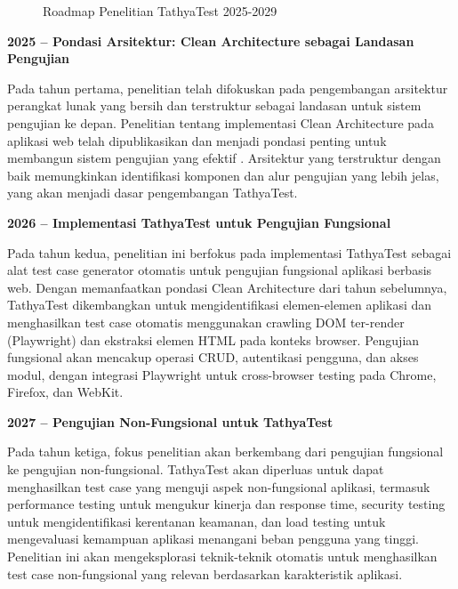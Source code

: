 \begin{figure}[ht]
{
}
\caption{Roadmap Penelitian TathyaTest 2025-2029}
\label{fig:roadmap}
\end{figure}

\vspace{0.3cm}

\textbf{2025 -- Pondasi Arsitektur: Clean Architecture sebagai Landasan Pengujian}

Pada tahun pertama, penelitian telah difokuskan pada pengembangan arsitektur perangkat lunak yang bersih dan terstruktur sebagai landasan untuk sistem pengujian ke depan. Penelitian tentang implementasi Clean Architecture pada aplikasi web telah dipublikasikan dan menjadi pondasi penting untuk membangun sistem pengujian yang efektif \parencite{rifai2025clean}. Arsitektur yang terstruktur dengan baik memungkinkan identifikasi komponen dan alur pengujian yang lebih jelas, yang akan menjadi dasar pengembangan TathyaTest.

\textbf{2026 -- Implementasi TathyaTest untuk Pengujian Fungsional}

Pada tahun kedua, penelitian ini berfokus pada implementasi TathyaTest sebagai alat test case generator otomatis untuk pengujian fungsional aplikasi berbasis web. Dengan memanfaatkan pondasi Clean Architecture dari tahun sebelumnya, TathyaTest dikembangkan untuk mengidentifikasi elemen-elemen aplikasi dan menghasilkan test case otomatis menggunakan crawling DOM ter-render (Playwright) dan ekstraksi elemen HTML pada konteks browser. Pengujian fungsional akan mencakup operasi CRUD, autentikasi pengguna, dan akses modul, dengan integrasi Playwright untuk cross-browser testing pada Chrome, Firefox, dan WebKit.

\textbf{2027 -- Pengujian Non-Fungsional untuk TathyaTest}

Pada tahun ketiga, fokus penelitian akan berkembang dari pengujian fungsional ke pengujian non-fungsional. TathyaTest akan diperluas untuk dapat menghasilkan test case yang menguji aspek non-fungsional aplikasi, termasuk performance testing untuk mengukur kinerja dan response time, security testing untuk mengidentifikasi kerentanan keamanan, dan load testing untuk mengevaluasi kemampuan aplikasi menangani beban pengguna yang tinggi. Penelitian ini akan mengeksplorasi teknik-teknik otomatis untuk menghasilkan test case non-fungsional yang relevan berdasarkan karakteristik aplikasi.

